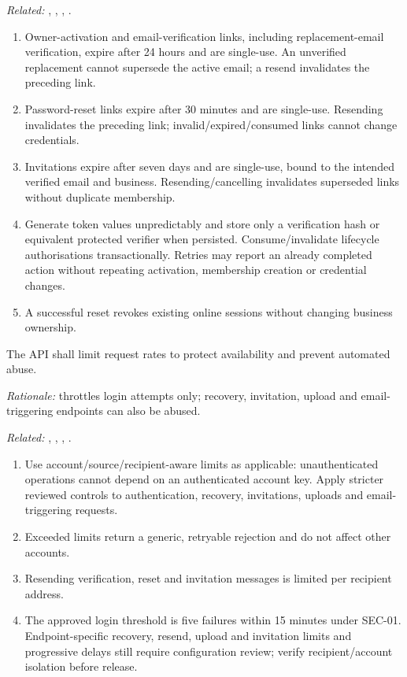 \textit{Related:} \hyperref[fr:001]{}, \hyperref[fr:005]{}, \hyperref[fr:006]{}, \hyperref[fr:064]{}.
\begin{enumerate}[label=(\alph*),leftmargin=*,itemsep=1pt,topsep=3pt]
\item Owner-activation and email-verification links, including replacement-email verification, expire after 24 hours and are single-use. An unverified replacement cannot supersede the active email; a resend invalidates the preceding link.
\item Password-reset links expire after 30 minutes and are single-use. Resending invalidates the preceding link; invalid/expired/consumed links cannot change credentials.
\item Invitations expire after seven days and are single-use, bound to the intended verified email and business. Resending/cancelling invalidates superseded links without duplicate membership.
\item Generate token values unpredictably and store only a verification hash or equivalent protected verifier when persisted. Consume/invalidate lifecycle authorisations transactionally. Retries may report an already completed action without repeating activation, membership creation or credential changes.
\item A successful reset revokes existing online sessions without changing business ownership.
\end{enumerate}

\label{nfr:SEC-10}
The API shall limit request rates to protect availability and prevent automated abuse.

\textit{Rationale:} \hyperref[nfr:SEC-01]{} throttles login attempts only; recovery, invitation, upload and email-triggering endpoints can also be abused.

\textit{Related:} \hyperref[fr:001]{}, \hyperref[fr:005]{}, \hyperref[fr:006]{}, \hyperref[fr:040]{}.
\begin{enumerate}[label=(\alph*),leftmargin=*,itemsep=1pt,topsep=3pt]
\item Use account/source/recipient-aware limits as applicable: unauthenticated operations cannot depend on an authenticated account key. Apply stricter reviewed controls to authentication, recovery, invitations, uploads and email-triggering requests.
\item Exceeded limits return a generic, retryable rejection and do not affect other accounts.
\item Resending verification, reset and invitation messages is limited per recipient address.
\item The approved login threshold is five failures within 15 minutes under SEC-01. Endpoint-specific recovery, resend, upload and invitation limits and progressive delays still require configuration review; verify recipient/account isolation before release.
\end{enumerate}

